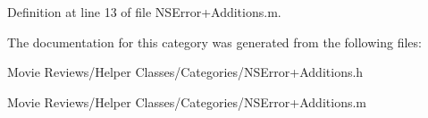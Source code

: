 Definition at line 13 of file N\+S\+Error+\+Additions.\+m.



The documentation for this category was generated from the following files\+:\begin{DoxyCompactItemize}
\item 
Movie Reviews/\+Helper Classes/\+Categories/N\+S\+Error+\+Additions.\+h\item 
Movie Reviews/\+Helper Classes/\+Categories/N\+S\+Error+\+Additions.\+m\end{DoxyCompactItemize}
